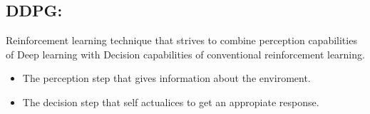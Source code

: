 \documentclass[11pt]{article}
\begin{document}
\subsection{DDPG:}
\label{sec:org0cd9b1d}
Reinforcement learning technique that strives to combine perception capabilities of Deep learning with Decision capabilities of conventional reinforcement learning.

\begin{itemize}
\item The perception step that gives information about the enviroment.
\item The decision step that self actualices to get an appropiate response.
\end{itemize}
\end{document}
